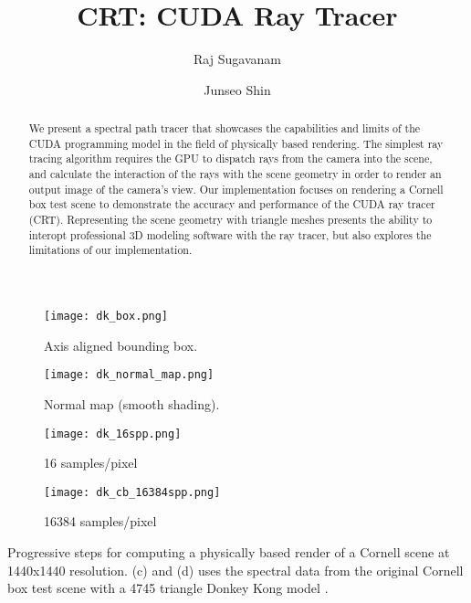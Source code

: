 \documentclass[sigconf, screen]{acmart}
\begin{document}
\title{CRT: CUDA Ray Tracer}

\author{Raj Sugavanam}
\author{Junseo Shin}

\begin{abstract}
    We present a spectral path tracer that showcases the capabilities and limits of the CUDA
    programming model in the field of physically based rendering. The simplest ray tracing
    algorithm requires the GPU to dispatch rays from the camera into the scene, and
    calculate the interaction of the rays with the scene geometry in order to render an output
    image of the camera's view. Our implementation focuses on rendering a Cornell box test scene
    to demonstrate the accuracy and performance of the CUDA ray tracer (CRT). Representing the
    scene geometry with triangle meshes presents the ability to interopt professional 3D modeling
    software with the ray tracer, but also explores the limitations of our implementation.
\end{abstract}

\begin{teaserfigure}
    \centering
    \begin{subfigure}{0.24\textwidth}
        \centering
        \texttt{[image: dk\_box.png]}
        \caption{Axis aligned bounding box.}
        \label{fig:teaser1}
    \end{subfigure}
    \begin{subfigure}{0.24\textwidth}
        \centering
        \texttt{[image: dk\_normal\_map.png]}
        \caption{Normal map (smooth shading).}
        \label{fig:teaser2}
    \end{subfigure}
    \begin{subfigure}{0.24\textwidth}
        \centering
        \texttt{[image: dk\_16spp.png]}
        \caption{16 samples/pixel}
        \label{fig:teaser3}
    \end{subfigure}
    \begin{subfigure}{0.24\textwidth}
        \centering
        \texttt{[image: dk\_cb\_16384spp.png]}
        \caption{16384 samples/pixel}
        \label{fig:teaser4}
    \end{subfigure}
    \caption{
        Progressive steps for computing a physically based render of a Cornell
        scene at 1440x1440 resolution. (c) and (d) uses the spectral data from the original
        Cornell box test scene with a 4745 triangle Donkey Kong model \cite{smash_melee}.
    }
    \label{fig:teaser}
\end{teaserfigure}
\end{document}
